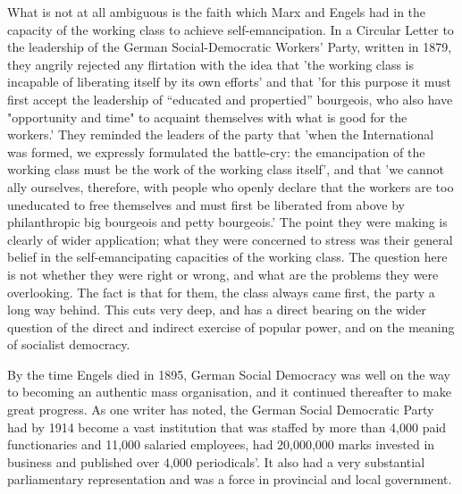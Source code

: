 What is not at all ambiguous is the faith which Marx and Engels had in the capacity of the working class to achieve self\hyp{}emancipation. In a Circular Letter to the leadership of the German Social-Democratic Workers' Party, written in 1879, they angrily rejected any flirtation with the idea that 'the working class is incapable of liberating itself by its own efforts' and that 'for this purpose it must first accept the leadership of “educated and propertied” bourgeois, who also have "opportunity and time" to acquaint themselves with what is good for the workers.' They reminded the leaders of the party that 'when the International was formed, we expressly formulated the battle\hyp{}cry: the emancipation of the working class must be the work of the working class itself', and that 'we cannot ally ourselves, therefore, with people who openly declare that the workers are too uneducated to free themselves and must first be liberated from above by philanthropic big bourgeois and petty bourgeois.' The point they were making is clearly of wider application; what they were concerned to stress was their general belief in the self-emancipating capacities of the working class. The question here is not whether they were right or wrong, and what are the problems they were overlooking. The fact is that for them, the class always came first, the party a long way behind. This cuts very deep, and has a direct bearing on the wider question of the direct and indirect exercise of popular power, and on the meaning of socialist democracy.

By the time Engels died in 1895, German Social Democracy was well on the way to becoming an authentic mass organisation, and it continued thereafter to make great progress. As one writer has noted, the German Social Democratic Party had by 1914 become a vast institution that was staffed by more than 4,000 paid functionaries and 11,000 salaried employees, had 20,000,000 marks invested in business and published over 4,000 periodicals'. It also had a very substantial parliamentary representation and was a force in provincial and local government.

